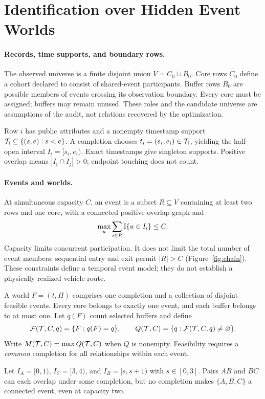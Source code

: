 \section{Identification over Hidden Event Worlds}
\label{sec:model}

\paragraph{Records, time supports, and boundary rows.}
The observed universe is a finite disjoint union $V=C_0\cup B_0$.
Core rows $C_0$ define a cohort declared to consist of shared-event
participants. Buffer rows $B_0$ are possible members of events crossing its
observation boundary. Every core must be assigned; buffers may remain unused.
These roles and the candidate universe are assumptions of the audit, not
relations recovered by the optimization.

Row $i$ has public attributes and a nonempty timestamp support
$\mathcal T_i\subseteq\{(s,e):s<e\}$. A completion chooses
$t_i=(s_i,e_i)\in\mathcal T_i$, yielding the half-open interval $I_i=[s_i,e_i)$.
Exact timestamps give singleton supports. Positive overlap means
$|I_i\cap I_j|>0$; endpoint touching does not count.

\paragraph{Events and worlds.}
At simultaneous capacity $C$, an event is a subset $R\subseteq V$ containing
at least two rows and one core, with a connected positive-overlap graph and
\begin{equation}
 \max_u\sum_{i\in R}\mathbb I\{u\in I_i\}\le C.
 \label{eq:capacity}
\end{equation}
Capacity limits concurrent participation. It does not limit the total number
of event members: sequential entry and exit permit $|R|>C$
(Figure~\ref{fig:chain}). These constraints define a temporal event model;
they do not establish a physically realized vehicle route.

A world $F=(t,\Pi)$ comprises one completion and a collection of disjoint
feasible events. Every core belongs to exactly one event, and each buffer
belongs to at most one. Let $q(F)$ count selected buffers and define
\[
 \mathcal F(\mathcal T,C,q)=\{F:q(F)=q\},\qquad
 Q(\mathcal T,C)=\{q:\mathcal F(\mathcal T,C,q)\ne\varnothing\}.
\]
Write $M(\mathcal T,C)=\max Q(\mathcal T,C)$ when $Q$ is nonempty. Feasibility requires a
\emph{common} completion for all relationships within each event.

\begin{proposition}
\label{prop:jointcompletion}
Let $I_A=[0,1)$, $I_C=[3,4)$, and $I_B=[s,s+1)$ with $s\in[0,3]$.
Pairs $AB$ and $BC$ can each overlap under some completion, but no completion
makes $\{A,B,C\}$ a connected event, even at capacity two.
\end{proposition}

